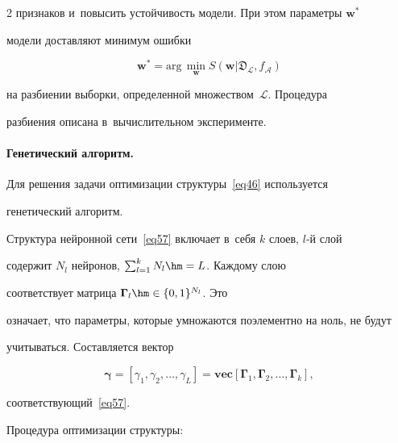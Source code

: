 \begin{multicols}{2}
признаков и~повысить устойчивость модели. При этом параметры $\mathbf{w}^*$ 


модели доставляют минимум ошибки


\begin{equation}


\label{eq102}


\mathbf{w}^* = \mathrm{arg}\,\underset{\mathbf{w}}\min 


S(\mathbf{w}|\mathfrak{D}_\mathcal{L}, f_\mathcal{A})


\end{equation}


на разбиении выборки, определенной множеством~$\mathcal{L}$. Процедура 


разбиения описана в~вы\-чис\-ли\-тель\-ном эксперименте.





\paragraph*{Генетический алгоритм.}


Для решения задачи оптимизации структуры~\eqref{eq46}  используется 


генетический алгоритм.


Структура нейронной сети~\eqref{eq57} включает в~себя $k$ слоев, $l$-й слой 


содержит $N_l$ нейронов, $\sum\nolimits_{l=1}^kN_l \hm= L$. Каждому слою 


соответствует матрица $\boldsymbol\Gamma_l \hm\in \{0,1\}^{N_l}$. Это 


означает, что па\-ра\-мет\-ры, которые умножаются поэлементно на ноль,  не будут 


учитываться. Составляется вектор


$$


\boldsymbol{\gamma} = 


[\gamma_1,\gamma_2,\dots,\gamma_L] = \mathbf{vec} 


[\boldsymbol\Gamma_1,\boldsymbol\Gamma_2,\dots,\boldsymbol\Gamma_k],


$$ 


соответствующий~\eqref{eq57}.


Процедура оптимизации структуры:


\end{multicols}
